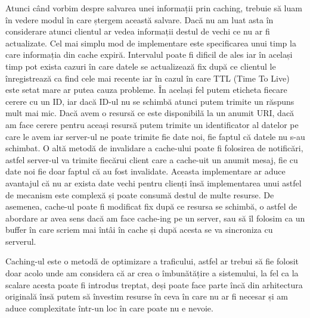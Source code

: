 Atunci când vorbim despre salvarea unei informații prin caching, trebuie să luam în
vedere modul în care ștergem această salvare. Dacă nu am luat asta în considerare atunci clientul
ar vedea informații destul de vechi ce nu ar fi actualizate. Cel mai simplu mod de implementare
este specificarea unui timp la care informația din cache expiră. Intervalul poate fi dificil
de ales iar în același timp pot exista cazuri în care datele se actualizează fix după ce
clientul le înregistrează ca find cele mai recente iar în cazul în care TTL (Time To Live) este
setat mare ar putea cauza probleme. În același fel putem eticheta fiecare cerere cu un ID,
iar dacă ID-ul nu se schimbă atunci putem trimite un răspuns mult mai mic. Dacă avem o resursă
ce este disponibilă la un anumit URI, dacă am face cerere pentru aceași resursă putem trimite
un identificator al datelor pe care le avem iar server-ul ne poate trimite fie date noi,
fie faptul că datele nu s-au schimbat. O altă metodă de invalidare a cache-ului poate
fi folosirea de notificări, astfel server-ul va trimite fiecărui client care a cache-uit
un anumit mesaj, fie cu date noi fie doar faptul că au fost invalidate. Aceasta implementare
ar aduce avantajul că nu ar exista date vechi pentru clienți însă implementarea unui astfel
de mecanism este complexă și poate consumă destul de multe resurse. De asemenea, cache-ul
poate fi modificat fix după ce resursa se schimbă, o astfel de abordare ar avea sens
dacă am face cache-ing pe un server, sau să îl folosim ca un buffer în care scriem mai întâi
în cache și după acesta se va sincroniza cu serverul.

Caching-ul este o metodă de optimizare a traficului, astfel ar trebui să fie folosit
doar acolo unde am considera că ar crea o îmbunătățire a sistemului, la fel ca la scalare
acesta poate fi introdus treptat, deși poate face parte încă din arhitectura originală
însă putem să învestim resurse în ceva în care nu ar fi necesar și am aduce complexitate
într-un loc în care poate nu e nevoie.
